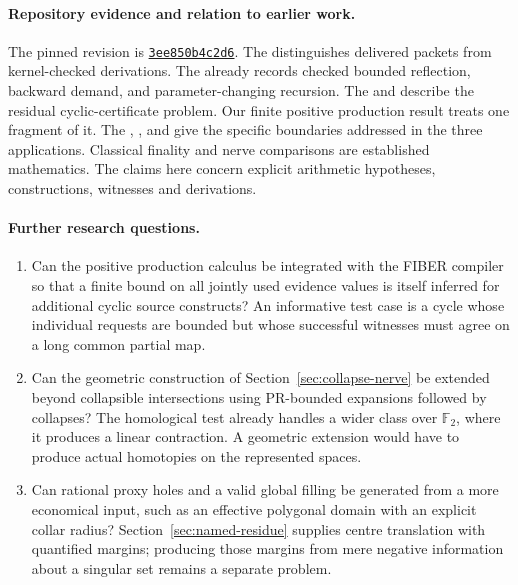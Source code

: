 \paragraph{Repository evidence and relation to earlier work.}
The pinned revision is \href{https://github.com/VladimirReshetnikov/ProveIt/tree/3ee850b4c2d650cf01263823fd5415963747c5d0/Logic/PrimitiveRecursiveArithmetic}{\texttt{3ee850b4c2d6}}. The  distinguishes delivered packets from kernel-checked derivations. The  already records checked bounded reflection, backward demand, and parameter-changing recursion. The  and  describe the residual cyclic-certificate problem. Our finite positive production result treats one fragment of it. The , , and  give the specific boundaries addressed in the three applications. Classical finality and nerve comparisons are established mathematics. The claims here concern explicit arithmetic hypotheses, constructions, witnesses and derivations.

\paragraph{Further research questions.}
\begin{enumerate}
\item Can the positive production calculus be integrated with the FIBER compiler so that a finite bound on all jointly used evidence values is itself inferred for additional cyclic source constructs? An informative test case is a cycle whose individual requests are bounded but whose successful witnesses must agree on a long common partial map.
\item Can the geometric construction of Section~\ref{sec:collapse-nerve} be extended beyond collapsible intersections using PR-bounded expansions followed by collapses? The homological test already handles a wider class over $\mathbb F_2$, where it produces a linear contraction. A geometric extension would have to produce actual homotopies on the represented spaces.
\item Can rational proxy holes and a valid global filling be generated from a more economical input, such as an effective polygonal domain with an explicit collar radius? Section~\ref{sec:named-residue} supplies centre translation with quantified margins; producing those margins from mere negative information about a singular set remains a separate problem.
\end{enumerate}
